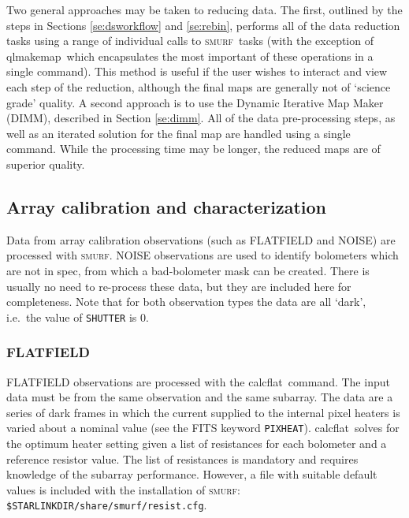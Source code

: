 \documentclass[twoside,11pt]{article}
\newcommand{\xref}[3]{#1}
\newcommand{\xlabel}[1]{}
\renewcommand{\_}{\texttt{\symbol{95}}}
\newcommand{\SMURF}{\textsc{smurf}}
\newcommand{\task}[1]{\textsf{#1}}
\newcommand{\calcflat}{\xref{\task{calcflat}}{sun258}{CALCFLAT}}
\newcommand{\qlmakemap}{\xref{\task{qlmakemap}}{sun258}{QLMAKEMAP}}
\begin{document}
Two general approaches may be taken to reducing data. The first,
outlined by the steps in Sections \ref{se:dsworkflow} and
\ref{se:rebin}, performs all of the data reduction tasks using a range
of individual calls to \SMURF\ tasks (with the exception of
\qlmakemap\ which encapsulates the most important of these operations
in a single command). This method is useful if the user wishes to
interact and view each step of the reduction, although the final maps
are generally not of `science grade' quality. A second approach is to
use the Dynamic Iterative Map Maker (DIMM), described in Section
\ref{se:dimm}. All of the data pre-processing steps, as well as an
iterated solution for the final map are handled using a single
command. While the processing time may be longer, the reduced maps are
of superior quality.

\subsection{\xlabel{arraycal}Array calibration and characterization\label{se:arraycal}}

Data from array calibration observations (such as FLATFIELD and NOISE)
are processed with \SMURF. NOISE observations are used to identify
bolometers which are not in spec, from which a bad-bolometer mask can
be created. There is usually no need to re-process these data, but
they are included here for completeness. Note that for both
observation types the data are all `dark', i.e.\ the value of
\texttt{SHUTTER} is 0.

\subsubsection{\xlabel{flatcal}FLATFIELD\label{se:flatcal}}

FLATFIELD observations are processed with the \calcflat\ command. The
input data must be from the same observation and the same
subarray. The data are a series of dark frames in which the current
supplied to the internal pixel heaters is varied about a nominal value
(see the FITS keyword \texttt{PIXHEAT}). \calcflat\ solves for the
optimum heater setting given a list of resistances for each bolometer
and a reference resistor value. The list of resistances is mandatory
and requires knowledge of the subarray performance. However, a file
with suitable default values is included with the installation of
\SMURF: \texttt{\$STARLINK\_DIR/share/smurf/resist.cfg}.
\end{document}
